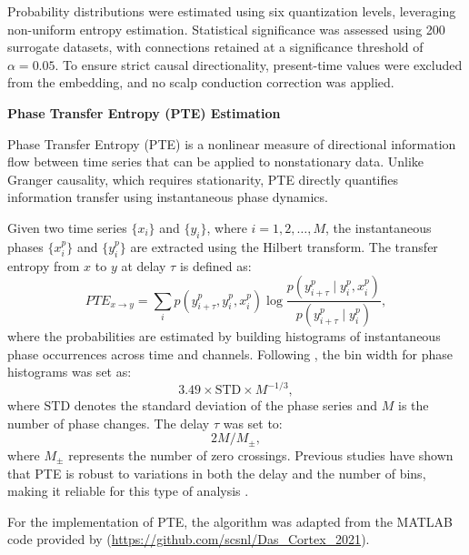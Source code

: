\documentclass[12pt,technote,onecolumn]{IEEEtran}
\begin{document}
Probability distributions were estimated using six quantization levels, leveraging non-uniform entropy estimation. Statistical significance was assessed using 200 surrogate datasets, with connections retained at a significance threshold of $\alpha = 0.05$. To ensure strict causal directionality, present-time values were excluded from the embedding, and no scalp conduction correction was applied.
\vspace{6mm}

\textbf{Phase Transfer Entropy (PTE) Estimation}
\vspace{4mm}

Phase Transfer Entropy (PTE) is a nonlinear measure of directional information flow between time series that can be applied to nonstationary data. Unlike Granger causality, which requires stationarity, PTE directly quantifies information transfer using instantaneous phase dynamics. 

Given two time series $\{x_i\}$ and $\{y_i\}$, where $i = 1, 2, \dots, M$, the instantaneous phases $\{x_i^p\}$ and $\{y_i^p\}$ are extracted using the Hilbert transform. The transfer entropy from $x$ to $y$ at delay $\tau$ is defined as:
\begin{equation}
PTE_{x \to y} = \sum_i p\left( y_{i+\tau}^p, y_i^p, x_i^p \right) \log \frac{p\left(y_{i+\tau}^p \mid y_i^p, x_i^p \right)}{p\left( y_{i+\tau}^p \mid y_i^p \right)} ,
\end{equation}
where the probabilities are estimated by building histograms of instantaneous phase occurrences across time and channels. Following \cite{das2024electrophysiological}, the bin width for phase histograms was set as:
\[
3.49 \times \mathrm{STD} \times M^{-1/3},
\]
where $\mathrm{STD}$ denotes the standard deviation of the phase series and $M$ is the number of phase changes. The delay $\tau$ was set to:
\[
2M/M_\pm,
\]
where $M_\pm$ represents the number of zero crossings. Previous studies have shown that PTE is robust to variations in both the delay and the number of bins, making it reliable for this type of analysis \cite{das2020spatiotemporal, das2022electrophysiological, das2022causal}.

For the implementation of PTE, the algorithm was adapted from the MATLAB code provided by \cite{das2022causal} (\url{https://github.com/scsnl/Das_Cortex_2021}).




\vspace{11pt}
\vfill
\begin{refcontext}[sorting=none]  
    \printbibliography  
\end{refcontext}
\end{document}
